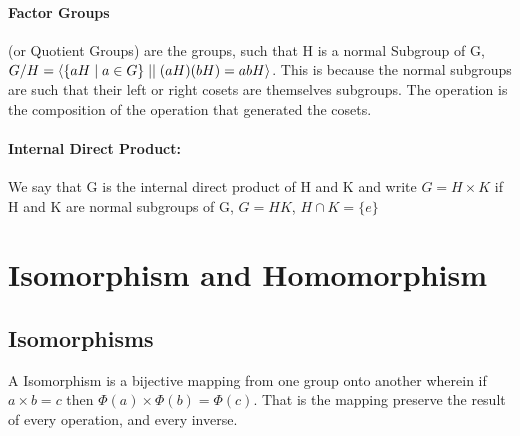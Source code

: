 \paragraph{Factor Groups} (or Quotient Groups) are the groups, such that H is a normal Subgroup of G, $G/H = \braket{\{aH\;|\;a \in G\}\;||\;(aH)(bH) = abH}$. This is because the normal subgroups are such that their left or right cosets are themselves subgroups. The operation is the composition of the operation that generated the cosets.
\vspace{5px} \paragraph{Internal Direct Product:} We say that G is the internal direct product of H and K and write $G = H \times K$ if H and K are normal subgroups of G, $G = HK$, $H \cap K = \{e\}$



\section{Isomorphism and Homomorphism}

\subsection{Isomorphisms}

\begin{definition}[Isomorphism]{}
A Isomorphism is a bijective mapping from one group onto another wherein if $ a \times b = c $ then $ \Phi(a) \times \Phi(b) = \Phi(c) $. That is the mapping preserve the result of every operation, and every inverse.
\end{definition}

